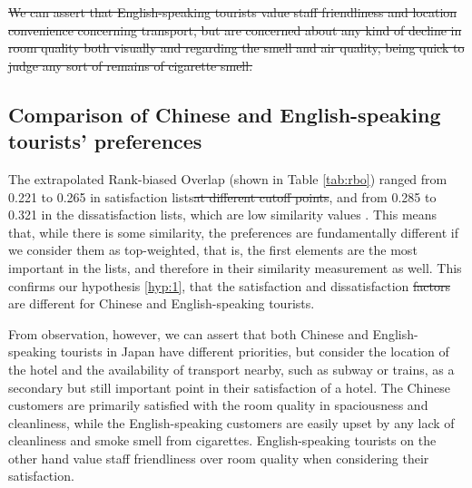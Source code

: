 \documentclass[review]{elsarticle}
\providecommand{\DIFadd}[1]{{\protect\color{blue}\uwave{#1}}} %
\providecommand{\DIFdel}[1]{{\protect\color{red}\sout{#1}}}                      %
\providecommand{\DIFaddbegin}{} %
\providecommand{\DIFaddend}{} %
\providecommand{\DIFdelbegin}{} %
\providecommand{\DIFdelend}{} %
\newcommand{\DIFscaledelfig}{0.5}
\newlength{\DIFdelgraphicswidth} %
\newlength{\DIFdelgraphicsheight} %
\newcommand{\DIFaddincludegraphics}[2][]{{\color{blue}\fbox{\DIFOincludegraphics[#1]{#2}}}} %
\newcommand{\DIFdelincludegraphics}[2][]{%
\sbox{\DIFdelgraphicsbox}{\DIFOincludegraphics[#1]{#2}}%
\settoboxwidth{\DIFdelgraphicswidth}{\DIFdelgraphicsbox} %
\settoboxtotalheight{\DIFdelgraphicsheight}{\DIFdelgraphicsbox} %
\scalebox{\DIFscaledelfig}{%
\parbox[b]{\DIFdelgraphicswidth}{\usebox{\DIFdelgraphicsbox}\\[-\baselineskip] \rule{\DIFdelgraphicswidth}{0em}}\llap{\resizebox{\DIFdelgraphicswidth}{\DIFdelgraphicsheight}{%
\setlength{\unitlength}{\DIFdelgraphicswidth}%
\begin{picture}(1,1)%
\thicklines\linethickness{2pt} %
{\color[rgb]{1,0,0}\put(0,0){\framebox(1,1){}}}%
{\color[rgb]{1,0,0}\put(0,0){\line( 1,1){1}}}%
{\color[rgb]{1,0,0}\put(0,1){\line(1,-1){1}}}%
\end{picture}%
}\hspace*{3pt}}} %
} %
\DeclareRobustCommand{\DIFaddbegin}{\DIFOaddbegin \let\includegraphics\DIFaddincludegraphics} %
\DeclareRobustCommand{\DIFaddend}{\DIFOaddend \let\includegraphics\DIFOincludegraphics} %
\DeclareRobustCommand{\DIFdelbegin}{\DIFOdelbegin \let\includegraphics\DIFdelincludegraphics} %
\DeclareRobustCommand{\DIFdelend}{\DIFOaddend \let\includegraphics\DIFOincludegraphics} %
\begin{document}
\DIFdel{We can assert that English-speaking tourists value staff friendliness and location convenience concerning transport, but are concerned about any kind of decline in room quality both visually and regarding the smell and air quality, being quick to judge any sort of remains of cigarette smell.
}%

\DIFdelend 

\subsection{Comparison of Chinese and English-speaking tourists' preferences}

The extrapolated Rank-biased Overlap (shown in Table \ref{tab:rbo}) ranged from 0.221 to 0.265 in satisfaction lists\DIFdelbegin \DIFdel{at different cutoff points}\DIFdelend , and from 0.285 to 0.321 in the dissatisfaction lists, which are low similarity values \DIFaddbegin \DIFadd{(\(RBO_{EXT} < 0.5\))}\DIFaddend . This means that, while there is some similarity, the preferences are fundamentally different if we consider them as top-weighted, that is, the first elements are the most important in the lists, and therefore in their similarity measurement as well. This confirms our hypothesis \ref{hyp:1}, that the \DIFaddbegin \DIFadd{priorities for }\DIFaddend satisfaction and dissatisfaction \DIFdelbegin \DIFdel{factors }\DIFdelend are different for Chinese and English-speaking tourists. 

From observation, however, we can assert that both Chinese and English-speaking tourists in Japan have different priorities, but consider the location of the hotel and the availability of transport nearby, such as subway or trains, as a secondary but still important point in their satisfaction of a hotel. The Chinese customers are primarily satisfied with the room quality in spaciousness and cleanliness, while the English-speaking customers are easily upset by any lack of cleanliness and smoke smell from cigarettes. English-speaking tourists on the other hand value staff friendliness over room quality when considering their satisfaction. 
\end{document}
